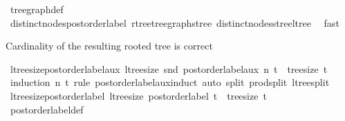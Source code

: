 \begin{isabellebody}
%
\isatagproof
{}\isamarkupfalse%
\ tree{\isacharunderscore}{\kern0pt}graph{\isacharunderscore}{\kern0pt}def\ \isamarkupfalse%
\ distinct{\isacharunderscore}{\kern0pt}nodes{\isacharunderscore}{\kern0pt}postorder{\isacharunderscore}{\kern0pt}label\ rtree{\isacharunderscore}{\kern0pt}tree{\isacharunderscore}{\kern0pt}graph{\isacharunderscore}{\kern0pt}stree\ distinct{\isacharunderscore}{\kern0pt}nodes{\isacharunderscore}{\kern0pt}stree{\isacharunderscore}{\kern0pt}ltree\ \isamarkupfalse%
\ fast%
\endisatagproof
{\isafoldproof}%
%
\isadelimproof
%
\endisadelimproof
%
\begin{isamarkuptext}%
Cardinality of the resulting rooted tree is correct%
\end{isamarkuptext}\isamarkuptrue%
\isamarkupfalse%
\ ltree{\isacharunderscore}{\kern0pt}size{\isacharunderscore}{\kern0pt}postorder{\isacharunderscore}{\kern0pt}label{\isacharunderscore}{\kern0pt}aux{\isacharcolon}{\kern0pt}\ {\isachardoublequoteopen}ltree{\isacharunderscore}{\kern0pt}size\ {\isacharparenleft}{\kern0pt}snd\ {\isacharparenleft}{\kern0pt}postorder{\isacharunderscore}{\kern0pt}label{\isacharunderscore}{\kern0pt}aux\ n\ t{\isacharparenright}{\kern0pt}{\isacharparenright}{\kern0pt}\ {\isacharequal}{\kern0pt}\ tree{\isacharunderscore}{\kern0pt}size\ t{\isachardoublequoteclose}\isanewline
%
\isadelimproof
\ \ %
\endisadelimproof
%
\isatagproof
{}\isamarkupfalse%
\ {\isacharparenleft}{\kern0pt}induction\ n\ t\ rule{\isacharcolon}{\kern0pt}\ postorder{\isacharunderscore}{\kern0pt}label{\isacharunderscore}{\kern0pt}aux{\isachardot}{\kern0pt}induct{\isacharparenright}{\kern0pt}\ {\isacharparenleft}{\kern0pt}auto\ split{\isacharcolon}{\kern0pt}\ prod{\isachardot}{\kern0pt}split\ ltree{\isachardot}{\kern0pt}split{\isacharparenright}{\kern0pt}%
\endisatagproof
{\isafoldproof}%
%
\isadelimproof
\isanewline
%
\endisadelimproof
\isanewline
{}\isamarkupfalse%
\ ltree{\isacharunderscore}{\kern0pt}size{\isacharunderscore}{\kern0pt}postorder{\isacharunderscore}{\kern0pt}label{\isacharcolon}{\kern0pt}\ {\isachardoublequoteopen}ltree{\isacharunderscore}{\kern0pt}size\ {\isacharparenleft}{\kern0pt}postorder{\isacharunderscore}{\kern0pt}label\ t{\isacharparenright}{\kern0pt}\ {\isacharequal}{\kern0pt}\ tree{\isacharunderscore}{\kern0pt}size\ t{\isachardoublequoteclose}\isanewline
%
\isadelimproof
\ \ %
\endisadelimproof
%
\isatagproof
{}\isamarkupfalse%
\ postorder{\isacharunderscore}{\kern0pt}label{\isacharunderscore}{\kern0pt}def\ \isamarkupfalse%

\end{isabellebody}
